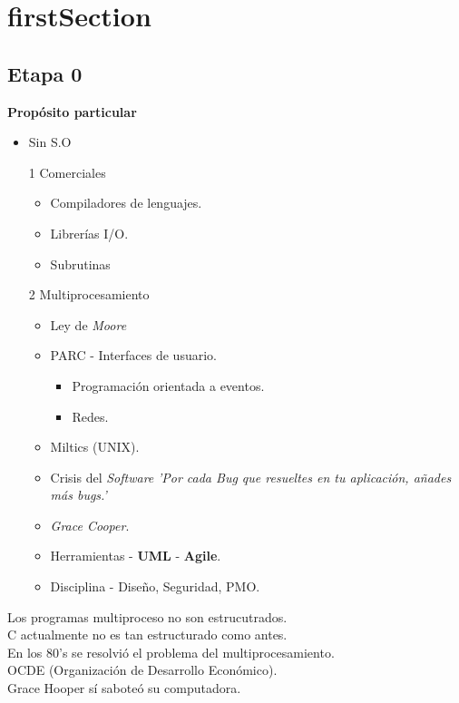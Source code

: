 \newpage
\part{\acrlong{firstSection}}

\chapter{Etapa 0}
\textbf{Prop\'{o}sito particular}

\begin{itemize}
	\item Sin S.O
	\item [1] Comerciales
		\begin{itemize}
			\item Compiladores de lenguajes.
			\item Librer\'{i}as I/O.
			\item Subrutinas
		\end{itemize}
	\item [2] Multiprocesamiento
		\begin{itemize}
			\item Ley de \textit{Moore}
			\item PARC - Interfaces de usuario.
			\begin{itemize}
				\item Programaci\'{o}n orientada a eventos.
				\item Redes.
			\end{itemize}
			\item Miltics (UNIX).
			\item Crisis del \textit{Software} \textit{'Por cada Bug que resueltes en tu aplicaci\'{o}n, a\~{n}ades m\'{a}s bugs.'}
			\item \textit{Grace Cooper}.
			\item Herramientas - \textbf{UML} - \textbf{Agile}.
			\item Disciplina - Dise\~{n}o, Seguridad, PMO.
		\end{itemize}
\end{itemize}

Los programas multiproceso no son estrucutrados.\\
C actualmente no es tan estructurado como antes.\\
En los 80's se resolvi\'{o} el problema del multiprocesamiento.\\
OCDE (Organizaci\'{o}n de Desarrollo Econ\'{o}mico).\\
Grace Hooper s\'{i} sabote\'{o} su computadora.

